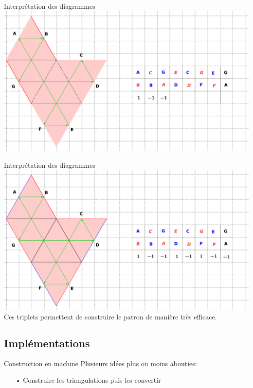 \documentclass[french,xcolor=dvipsnames]{beamer}
\begin{document}
		\begin{frame}{Interprétation des diagrammes}
			\includegraphics[scale=0.1]{conversion_tuckey_patron_5.eps}
		\end{frame}
		
		\begin{frame}{Interprétation des diagrammes}
			\includegraphics[scale=0.1]{conversion_tuckey_patron_6.eps}\\
			Ces triplets permettent de construire le patron de manière très efficace.
		\end{frame}
		
		\subsection{Implémentations}
		\begin{frame}{Construction en machine}
			Plusieurs idées plus ou moins abouties:\\
			\begin{enumerate}
			\item[•] Construire les triangulations puis les convertir
			\end{enumerate}
		\end{frame}
\end{document}
